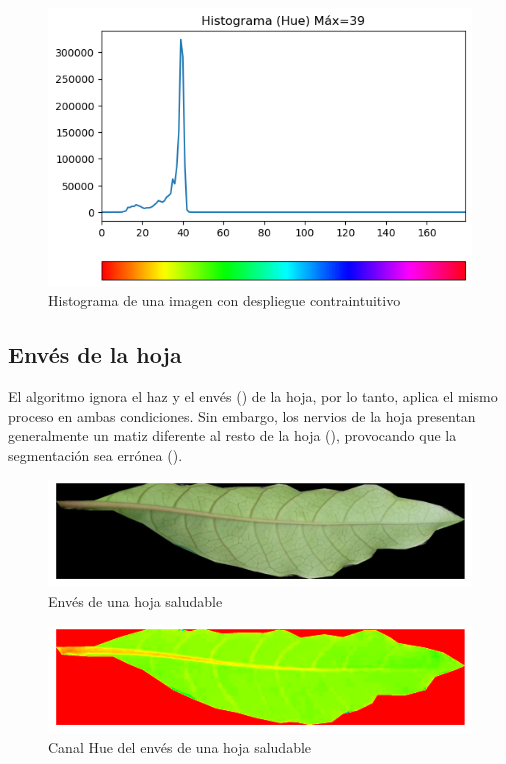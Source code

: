 \begin{figure}[H]
\centering
\includegraphics[width=\textwidth]{images/special_case_light_2_histogram.png}
\caption{Histograma de una imagen con despliegue contraintuitivo}
\label{img:light_2_binary}
\end{figure}

\subsection{Envés de la hoja}
El algoritmo ignora el haz y el envés () de la hoja, por lo tanto, aplica el mismo proceso en ambas condiciones. Sin embargo, los nervios de la hoja presentan generalmente un matiz diferente al resto de la hoja (), provocando que la segmentación sea errónea ().

\begin{figure}[H]
\centering
\includegraphics[scale=1]{images/special_case_backbone_rgb.png}
\caption{Envés de una hoja saludable}
\label{img:backbone_rgb}
\end{figure}

\begin{figure}[H]
\centering
\includegraphics[scale=1]{images/special_case_backbone_hue.png}
\caption{Canal Hue del envés de una hoja saludable}
\label{img:backbone_hue}
\end{figure}

